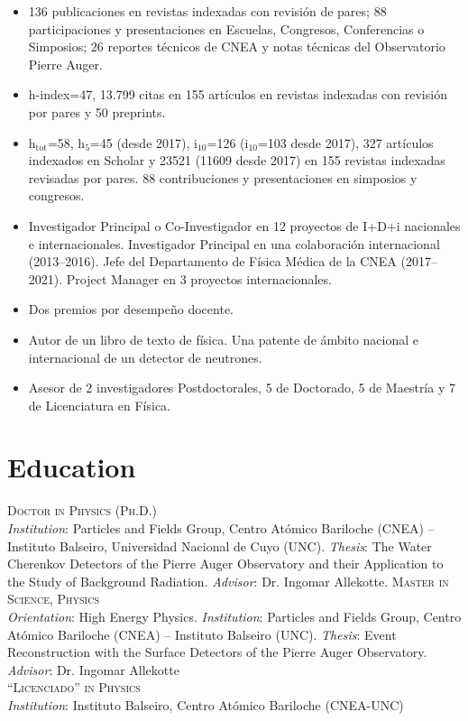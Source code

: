\begin{itemize}
    \item {} 136 publicaciones en revistas indexadas con revisión de pares; 88 participaciones y presentaciones en Escuelas, Congresos, Conferencias o Simposios; 26 reportes técnicos de CNEA y notas técnicas del Observatorio Pierre Auger.
    \item {} h-index=47, 13.799 citas en 155 artículos en revistas indexadas con revisión por pares y 50 preprints.
    \item {} h$_{\text{tot}}$=58, h$_5$=45 (desde 2017), i$_{10}$=126 (i$_{10}$=103 desde 2017), 327 artículos indexados en Scholar y 23521 (11609 desde 2017) en 155 revistas indexadas revisadas por pares. 88 contribuciones y presentaciones en simposios y congresos.
    \item {} Investigador Principal o Co-Investigador en 12 proyectos de I+D+i nacionales e internacionales. Investigador Principal en una colaboración internacional (2013--2016). Jefe del Departamento de Física Médica de la CNEA (2017--2021). Project Manager en 3 proyectos internacionales.
    \item {} Dos premios por desempeño docente.
    \item {} Autor de un libro de texto de física. Una patente de ámbito nacional e internacional de un detector de neutrones.
    \item {} Asesor de 2 investigadores Postdoctorales, 5 de Doctorado, 5 de Maestría y 7 de Licenciatura en Física.
\end{itemize}
\fi

\ifeng
\section*{Education}
\noindent
{}\textsc{Doctor in Physics (Ph.D.)}\\
{\emph{Institution}}: Particles and Fields Group, Centro Atómico Bariloche (CNEA) -- Instituto Balseiro, Universidad Nacional de Cuyo (UNC). {\emph{Thesis}}: The Water Cherenkov Detectors of the Pierre Auger Observatory and their Application to the Study of Background Radiation. {\emph{Advisor}}: Dr. Ingomar Allekotte.
\textsc{Master in Science, Physics}\\
{\emph{Orientation}}: High Energy Physics. {\emph{Institution}}: Particles and Fields Group, Centro Atómico Bariloche (CNEA) -- Instituto Balseiro (UNC). {\emph{Thesis}}: Event Reconstruction with the Surface Detectors of the Pierre Auger Observatory. {\emph{Advisor}}: Dr. Ingomar Allekotte\\
\textsc{``Licenciado'' in Physics}\\
{\emph{Institution}}: Instituto Balseiro, Centro Atómico Bariloche (CNEA-UNC)\\
\else
